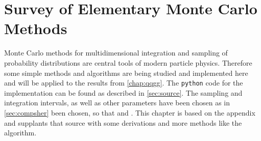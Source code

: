 
\chapter{Survey of Elementary Monte Carlo Methods}%
\label{chap:mc}

Monte Carlo methods for multidimensional integration and sampling of
probability distributions are central tools of modern particle
physics. Therefore some simple methods and algorithms are being
studied and implemented here and will be applied to the results from
\cref{chap:qqgg}. The \verb|python| code for the implementation can be
found as described in \cref{sec:source}. The sampling and integration
intervals, as well as other parameters have been chosen as in
\cref{sec:compsher} been chosen, so that  and
. This chapter is based on the
appendix~\cite{buckley:2011ge} and supplants that source with some
derivations and more methods like the \vegas~\cite{Lepage:19781an}
algorithm.

